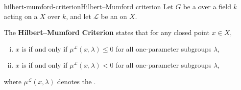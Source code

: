 \begin{topic}{hilbert-mumford-criterion}{Hilbert--Mumford criterion}
    Let $G$ be a  over a field $k$ acting on a  $X$  over $k$, and let $\mathcal{L}$ be an    on $X$.
    
    The \textbf{Hilbert--Mumford Criterion} states that for any closed point $x \in X$,
    \begin{enumerate}[(i)]
        \item $x$ is  if and only if $\mu^\mathcal{L}(x, \lambda) \le 0$ for all one-parameter subgroups $\lambda$,
        \item $x$ is  if and only if $\mu^\mathcal{L}(x, \lambda) < 0$ for all one-parameter subgroups $\lambda$,
    \end{enumerate}
    where $\mu^\mathcal{L}(x, \lambda)$ denotes the .
\end{topic}

